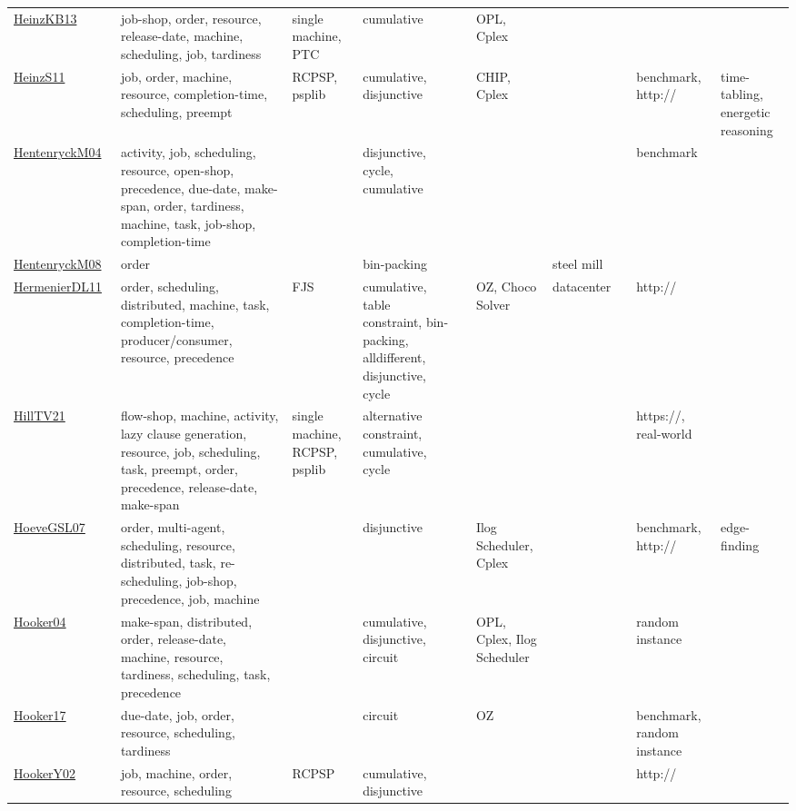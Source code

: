 {\begin{longtable}{p{3cm}p{4cm}p{2cm}p{2cm}p{2cm}p{2cm}p{2cm}p{2cm}p{2cm}p{2cm}}
\href{papers/HeinzKB13.pdf}{HeinzKB13}~\cite{HeinzKB13} & job-shop, order, resource, release-date, machine, scheduling, job, tardiness & single machine, PTC & cumulative &  & OPL, Cplex &  &  &  & \\
\href{papers/HeinzS11.pdf}{HeinzS11}~\cite{HeinzS11} & job, order, machine, resource, completion-time, scheduling, preempt & RCPSP, psplib & cumulative, disjunctive &  & CHIP, Cplex &  &  & benchmark, http:// & time-tabling, energetic reasoning\\
\href{papers/HentenryckM04.pdf}{HentenryckM04}~\cite{HentenryckM04} & activity, job, scheduling, resource, open-shop, precedence, due-date, make-span, order, tardiness, machine, task, job-shop, completion-time &  & disjunctive, cycle, cumulative &  &  &  &  & benchmark & \\
\href{papers/HentenryckM08.pdf}{HentenryckM08}~\cite{HentenryckM08} & order &  & bin-packing &  &  & steel mill &  &  & \\
\href{papers/HermenierDL11.pdf}{HermenierDL11}~\cite{HermenierDL11} & order, scheduling, distributed, machine, task, completion-time, producer/consumer, resource, precedence & FJS & cumulative, table constraint, bin-packing, alldifferent, disjunctive, cycle &  & OZ, Choco Solver & datacenter &  & http:// & \\
\href{papers/HillTV21.pdf}{HillTV21}~\cite{HillTV21} & flow-shop, machine, activity, lazy clause generation, resource, job, scheduling, task, preempt, order, precedence, release-date, make-span & single machine, RCPSP, psplib & alternative constraint, cumulative, cycle &  &  &  &  & https://, real-world & \\
\href{papers/HoeveGSL07.pdf}{HoeveGSL07}~\cite{HoeveGSL07} & order, multi-agent, scheduling, resource, distributed, task, re-scheduling, job-shop, precedence, job, machine &  & disjunctive &  & Ilog Scheduler, Cplex &  &  & benchmark, http:// & edge-finding\\
\href{papers/Hooker04.pdf}{Hooker04}~\cite{Hooker04} & make-span, distributed, order, release-date, machine, resource, tardiness, scheduling, task, precedence &  & cumulative, disjunctive, circuit &  & OPL, Cplex, Ilog Scheduler &  &  & random instance & \\
\href{papers/Hooker17.pdf}{Hooker17}~\cite{Hooker17} & due-date, job, order, resource, scheduling, tardiness &  & circuit &  & OZ &  &  & benchmark, random instance & \\
\href{papers/HookerY02.pdf}{HookerY02}~\cite{HookerY02} & job, machine, order, resource, scheduling & RCPSP & cumulative, disjunctive &  &  &  &  & http:// & \\

\end{longtable}}
